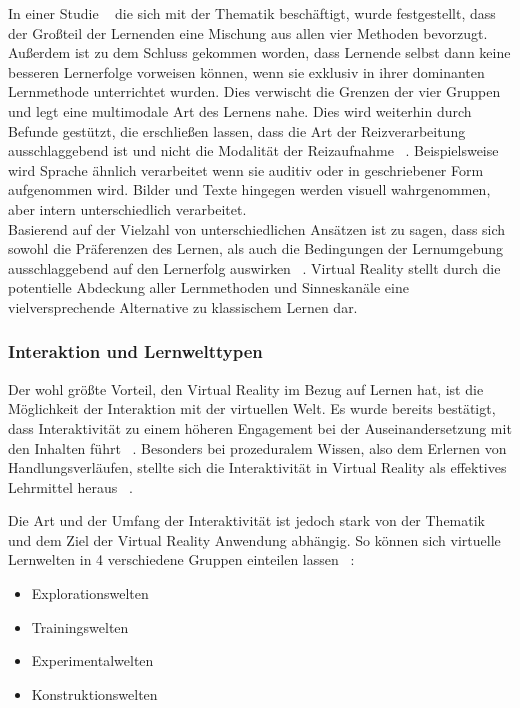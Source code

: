 In einer Studie ~\parencite{8971204} die sich mit der Thematik beschäftigt, wurde festgestellt, dass der Großteil der Lernenden eine Mischung aus allen vier Methoden bevorzugt. Außerdem ist zu dem Schluss gekommen worden, dass Lernende selbst dann keine besseren Lernerfolge vorweisen können, wenn sie exklusiv in ihrer dominanten Lernmethode unterrichtet wurden. Dies verwischt die Grenzen der vier Gruppen und legt eine multimodale Art des Lernens nahe.
Dies wird weiterhin durch Befunde gestützt, die erschließen lassen, dass die Art der Reizverarbeitung ausschlaggebend ist und nicht die Modalität der Reizaufnahme ~\parencite{UBHD-67741817}. Beispielsweise wird Sprache ähnlich verarbeitet wenn sie auditiv oder in geschriebener Form aufgenommen wird. Bilder und Texte hingegen werden visuell wahrgenommen, aber intern unterschiedlich verarbeitet.\\

Basierend auf der Vielzahl von unterschiedlichen Ansätzen ist zu sagen, dass sich sowohl die Präferenzen des Lernen, als auch die Bedingungen der Lernumgebung ausschlaggebend auf den Lernerfolg auswirken ~\parencite{UBHD-67741817}. Virtual Reality stellt durch die potentielle Abdeckung aller Lernmethoden und Sinneskanäle eine vielversprechende Alternative zu klassischem Lernen dar. 

\subsubsection{Interaktion und Lernwelttypen}
Der wohl größte Vorteil, den Virtual Reality im Bezug auf Lernen hat, ist die Möglichkeit der Interaktion mit der virtuellen Welt. Es wurde bereits bestätigt, dass Interaktivität zu einem höheren Engagement bei der Auseinandersetzung mit den Inhalten führt ~\parencite{8864531}. Besonders bei prozeduralem Wissen, also dem Erlernen von Handlungsverläufen, stellte sich die Interaktivität in Virtual Reality als effektives Lehrmittel heraus ~\parencite{8797755}. \newline

Die Art und der Umfang der Interaktivität ist jedoch stark von der Thematik und dem Ziel der Virtual Reality Anwendung abhängig. So können sich virtuelle Lernwelten in 4 verschiedene Gruppen einteilen lassen ~\parencite{UBHD-65563883}:

\begin{itemize}
\item Explorationswelten
\item Trainingswelten
\item Experimentalwelten
\item Konstruktionswelten
\end{itemize}

